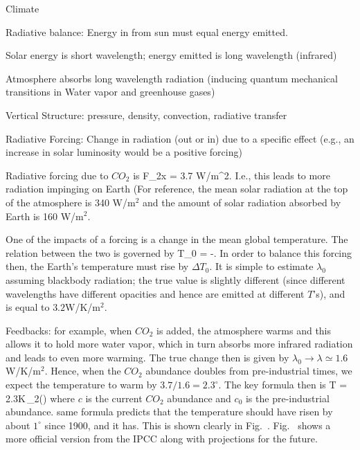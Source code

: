 \documentclass[11pt]{book}
\begin{document}
\eee
\item Climate
\bee
\item Radiative balance: Energy in from sun must equal energy emitted. 
\bei
\item Solar energy is short wavelength; energy emitted is long wavelength (infrared)
\item Atmosphere absorbs long wavelength radiation (inducing quantum mechanical transitions in Water vapor and greenhouse gases)
\item Vertical Structure: pressure, density, convection, radiative transfer
\item Radiative Forcing: Change in radiation (out or in) due to a specific effect (e.g., an increase in solar luminosity would be a positive forcing)
\item Radiative forcing due to $CO_2$ is
\be
F_{2x} = 3.7 W/m^2.\ee
I.e., this leads to more radiation impinging on Earth (For reference, the mean solar radiation at the top of the atmosphere is 340 W/m$^2$ and the amount of solar radiation absorbed by Earth is 160 W/m$^2$.
\item One of the impacts of a forcing is a change in the mean global temperature. The relation between the two is governed by
\be
\Delta T_0 = -.\ee 
In order to balance this forcing then, the Earth's temperature must rise by $\Delta T_0$. It is simple to estimate $\lambda_0$ assuming blackbody radiation; the true value is slightly different (since different wavelengths have different opacities and hence are emitted at different $T$'s), and is equal to $3.2$W/K/m$^2$. 
\item Feedbacks: for example, when $CO_2$ is added, the atmosphere warms and this allows it to hold more water vapor, which in turn absorbs more infrared radiation and leads to even more warming. The true change then is given by $\lambda_0\rightarrow\lambda \simeq 1.6$W/K/m$^2$. Hence, when the $CO_2$ abundance doubles from pre-industrial times, we expect the temperature to warm by $3.7/1.6=2.3^\circ$. The key formula then is
\be
\Delta T = 2.3K\,\log_2\left(\right)\ee
where $c$ is the current $CO_2$ abundance and $c_0$ is the pre-industrial abundance.
same formula predicts that the temperature should have risen by about $1^\circ$ since 1900, and it has. This is shown clearly in Fig.~. 
Fig.~ shows a more official version from the IPCC along with projections for the future.
\eei 
\eee
\eei
\end{document}
